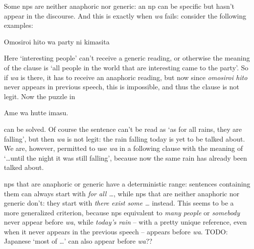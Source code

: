 \documentclass[UTF8, a4paper, oneside, scheme=plain]{ctexart}
\newcommand{\corpus}[1]{\emph{#1}}
\newcommand{\translate}[1]{`#1'}
\begin{document}
Some \ac{np}s are neither anaphoric nor generic:
an \ac{np} can be specific but hasn't appear in the discourse.
And this is exactly when \corpus{wa} fails:
consider the following examples:
\begin{exe}
    \ex *Omosiroi hito wa party ni kimasita
\end{exe}
Here \translate{interesting people} can't receive a generic reading,
or otherwise the meaning of the clause is 
\translate{all people in the world that are interesting came to the party}.
So if \corpus{wa} is there, 
it has to receive an anaphoric reading,
but now since \corpus{omosiroi hito} never appears in previous speech,
this is impossible,
and thus the clause is not legit.
Now the puzzle in 
\begin{exe}
    \ex *Ame wa hutte imasu.
\end{exe}
can be solved. 
Of course the sentence can't be read as \translate{as for all rains, they are falling},
but then \corpus{wa} is not legit:
the rain falling today is yet to be talked about.
We are, however, permitted to use \corpus{wa} in a following clause with the meaning of 
\translate{\dots until the night it was still falling},
because now the same rain has already been talked about.

\ac{np}s that are anaphoric or generic have a deterministic range:
sentences containing them can always start with \corpus{for all \dots},
while \ac{np}s that are neither anaphoric nor generic don't:
they start with \corpus{there exist some \dots} instead.
This seems to be a more generalized criterion,
because \ac{np}s equivalent to \corpus{many people} or \corpus{somebody} 
never appear before \corpus{wa},
while \corpus{today's rain} -- 
with a pretty unique reference, even when it never appears in the previous speech -- 
appears before \corpus{wa}.
TODO: Japanese \translate{most of \dots} can also appear before \corpus{wa}??
\end{document}
